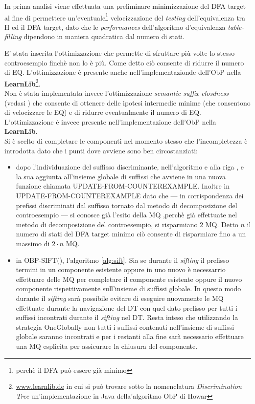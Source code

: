 In prima analisi viene effettuata una preliminare minimizzazione del \ac{DFA} target al fine di permettere un'eventuale\footnote{perchè il \ac{DFA} può essere già minimo} velocizzazione del \textit{testing} dell'equivalenza tra \ac{H} ed il \ac{DFA} target, dato che le \textit{performances} dell'algoritmo d'equivalenza \textit{table-filling} dipendono in maniera quadratica dal numero di stati.

E' stata inserita l'ottimizzazione che permette di sfruttare più volte lo stesso controesempio finchè non lo è più. Come detto ciò consente di ridurre il numero di \ac{EQ}. L'ottimizzazione è presente anche nell'implementazionde dell'\ac{ObP} nella \textbf{LearnLib}\footnote{\url{www.learnlib.de} in cui si può trovare sotto la nomenclatura \textit{Discrimination Tree} un'implementazione in Java della'algoritmo \ac{ObP} di Howar}.\\
Non è stata implementata invece l'ottimizzazione \textit{semantic suffix closdness} (vedasi \cite{Stef11}) che consente di ottenere delle ipotesi intermedie minime (che consentono di velocizzare le \ac{EQ}) e di ridurre eventualmente il numero  di \ac{EQ}. L'ottimizzazione è invece presente nell'implementazione  dell'\ac{ObP} nella \textbf{LearnLib}.\\
Si è scelto di completare le componenti nel momento stesso che l'incompletezza è introdotta dato che i punti dove avviene sono ben circostanziati:
\begin{itemize} 
\item dopo l'individuazione del suffisso discriminante, nell'algoritmo e alla riga , e la sua aggiunta all'insieme globale di suffissi che avviene in una nuova funzione chiamata UPDATE-FROM-COUNTEREXAMPLE. Inoltre in UPDATE-FROM-COUNTEREXAMPLE  dato che --- in corrispondenza dei prefissi discriminati dal suffisso tornato dal metodo di decomposizione del controesempio --- si conosce già l'esito della \ac{MQ} ,perchè già effettuate nel metodo di decomposizione del controesempio, si risparmiano 2 \ac{MQ}. Detto $n$ il numero di stati del \ac{DFA} target minimo ciò consente di risparmiare fino a un massimo di $2\cdot n$ \ac{MQ}.
 \item in OBP-SIFT(), l'algoritmo \ref{alg:sift}. Sia se durante il \textit{sifting} il prefisso termini in un componente esistente oppure in uno nuovo è necessarrio effettuare delle \ac{MQ} per completare il componente esistente oppure il nuovo componente rispettivamente sull'insieme di suffissi globale.  In questo modo durante il \textit{sifting} sarà possibile evitare di eseguire nuovamente le \ac{MQ} effettuate durante la navigazione del \ac{DT} con quel dato prefisso per tutti i suffissi incontrati durante il \textit{sifting} nel \ac{DT}. Resta inteso che utilizzando la strategia OneGlobally non tutti i suffissi contenuti nell'insieme di suffissi globale saranno incontrati e per i restanti alla fine sarà necessario effettuare una \ac{MQ} esplicita per assicurare la chiusura del componente. 
\end{itemize}
